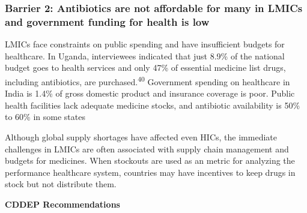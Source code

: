 \documentclass[
  11pt,
  paper=a4,
  ,captions=tableheading
]{scrartcl}
\begin{document}
\hypertarget{barrier-2-antibiotics-are-not-affordable-for-many-in-lmics-and-government-funding-for-health-is-low}{%
\subsubsection*{Barrier 2: Antibiotics are not affordable for many in
LMICs and government funding for health is
low}\label{barrier-2-antibiotics-are-not-affordable-for-many-in-lmics-and-government-funding-for-health-is-low}}

LMICs face constraints on public spending and have insufficient budgets
for healthcare. In Uganda, interviewees indicated that just 8.9\% of the
national budget goes to health services and only 47\% of essential
medicine list drugs, including antibiotics, are
purchased.\textsuperscript{40} Government spending on healthcare in
India is 1.4\% of gross domestic product and insurance coverage is poor.
Public health facilities lack adequate medicine stocks, and antibiotic
availability is 50\% to 60\% in some states

Although global supply shortages have affected even HICs, the immediate
challenges in LMICs are often associated with supply chain management
and budgets for medicines. When stockouts are used as an metric for
analyzing the performance healthcare system, countries may have
incentives to keep drugs in stock but not distribute them.

\textbf{CDDEP Recommendations}
\end{document}
